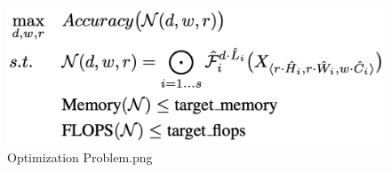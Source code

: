 \begin{figure}[htpb]
\centering
\includegraphics[width=\textwidth,height=\textheight,keepaspectratio]{../../static/Optimization Problem.png}
\caption{Optimization Problem.png}
\end{figure}